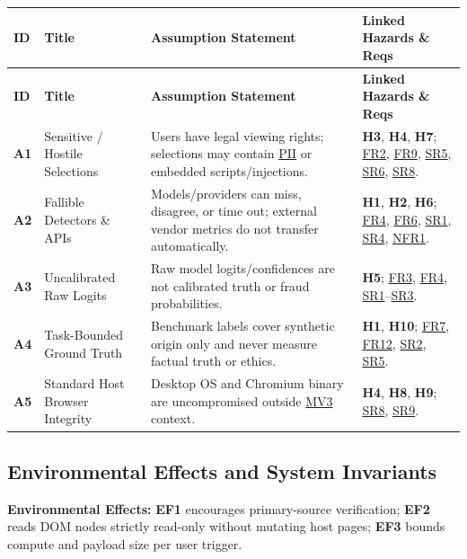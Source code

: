 \documentclass[11pt]{article}
\newcommand{\MVThree}{\hyperlink{acr-mv3}{MV3}}
\newcommand{\PII}{\hyperlink{acr-pii}{PII}}
\begin{document}
{\small
\begin{tabularx}{\textwidth}{l P{3.2cm} Y Y}
\caption{Domain and Infrastructure Assumptions} \label{TblAssumptions}\\
\toprule
\textbf{ID} & \textbf{Title} & \textbf{Assumption Statement} & \textbf{Linked Hazards \& Reqs}\\
\midrule
\endfirsthead
\toprule
\textbf{ID} & \textbf{Title} & \textbf{Assumption Statement} & \textbf{Linked Hazards \& Reqs}\\
\midrule
\endhead
\bottomrule
\endfoot
{}\label{A1}\textbf{A1} & Sensitive / Hostile Selections & Users have legal viewing rights; selections may contain \PII{} or embedded scripts/injections. & \textbf{H3}, \textbf{H4}, \textbf{H7}; \hyperref[FR2]{FR2}, \hyperref[FR9]{FR9}, \hyperref[SR5]{SR5}, \hyperref[SR6]{SR6}, \hyperref[SR8]{SR8}.\\
\midrule
{}\label{A2}\textbf{A2} & Fallible Detectors \& APIs & Models/providers can miss, disagree, or time out; external vendor metrics do not transfer automatically. & \textbf{H1}, \textbf{H2}, \textbf{H6}; \hyperref[FR4]{FR4}, \hyperref[FR6]{FR6}, \hyperref[SR1]{SR1}, \hyperref[SR4]{SR4}, \hyperref[NFR1]{NFR1}.\\
\midrule
{}\label{A3}\textbf{A3} & Uncalibrated Raw Logits & Raw model logits/confidences are not calibrated truth or fraud probabilities. & \textbf{H5}; \hyperref[FR3]{FR3}, \hyperref[FR4]{FR4}, \hyperref[SR1]{SR1}--\hyperref[SR3]{SR3}.\\
\midrule
{}\label{A4}\textbf{A4} & Task-Bounded Ground Truth & Benchmark labels cover synthetic origin only and never measure factual truth or ethics. & \textbf{H1}, \textbf{H10}; \hyperref[FR7]{FR7}, \hyperref[FR12]{FR12}, \hyperref[SR2]{SR2}, \hyperref[SR5]{SR5}.\\
\midrule
{}\label{A5}\textbf{A5} & Standard Host Browser Integrity & Desktop OS and Chromium binary are uncompromised outside \MVThree{} context. & \textbf{H4}, \textbf{H8}, \textbf{H9}; \hyperref[SR8]{SR8}, \hyperref[SR9]{SR9}.\\
\end{tabularx}
}

\subsection{Environmental Effects and System Invariants}\label{subsec:effects-invariants}

\noindent\textbf{Environmental Effects:} \textbf{EF1} encourages primary-source verification; \textbf{EF2} reads DOM nodes strictly read-only without mutating host pages; \textbf{EF3} bounds compute and payload size per user trigger.
\end{document}
